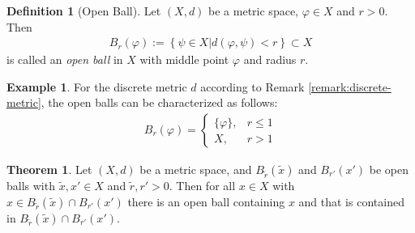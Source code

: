 \documentclass[12pt, a4paper]{article}
\numberwithin{equation}{section}
\theoremstyle{definition}
\theoremstyle{definition}
\newtheorem{defn}[thm]{Definition} %
\newtheorem{exmp}[thm]{Example} %
\newtheorem{theorem}[thm]{Theorem}
\begin{document}
	\begin{defn}[Open Ball]
		Let $(X, d)$ be a metric space, $\varphi\in X$ and $r > 0$. Then 
		\begin{align}
			B_{r}(\varphi) := \left\{ \psi\in X \vert d(\varphi, \psi) < r\right\} \subset X
		\end{align}
		is called an \textit{open ball} in $X$ with middle point $\varphi$ and radius $r$. 
 	\end{defn}
 
 	\begin{exmp}\label{exmp:open-balls-discrete-metric}
 		For the discrete metric $d$ according to Remark \ref{remark:discrete-metric}, the open balls can be characterized as follows:
 		\begin{align}
 			B_{r}(\varphi) = \begin{cases}
 				\{\varphi\}, &r \leq 1 
 				\\ X, &r > 1
 			\end{cases}
 		\end{align}
 	\end{exmp} 
	
	\begin{theorem}\label{thrm:intersection_open_balls}
		Let $(X, d)$ be a metric space, and $B_{\tilde{r}}(\tilde{x})$ and $B_{r'}(x')$ be open balls with $\tilde{x}, x'\in X$ and $\tilde{r}, r' > 0$. Then for all $x\in X$ with $x\in B_{\tilde{r}}(\tilde{x})\cap B_{r'}(x')$ there is an open ball containing $x$ and that is contained in $B_{\tilde{r}}(\tilde{x})\cap B_{r'}(x')$.
	\end{theorem}
\end{document}
